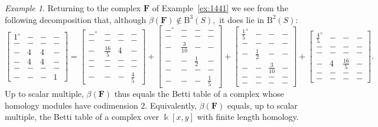 \documentclass[12pt]{amsart}
\theoremstyle{definition}
\theoremstyle{remark}
\newtheorem{example}[lemma]{Example}
\newcommand{\kk}{\Bbbk}
\newcommand{\FF}{\mathbf{F}}
\newcommand{\zp}{\circ}
\newcommand{\BBQ}{\mathrm{B}}
\begin{document}
\begin{example}\label{ex:1441bis}
Returning to the complex $\FF$ of Example~\ref{ex:1441}
we see from the following decomposition that, although $\beta(\FF)\notin \BBQ^3(S),$ it does lie in $\BBQ^2(S)$:
\[
\begin{bmatrix} 1^\zp&-&-&-\\ -&-&-&-\\-&4&4&-\\-&4&4&-\\-&-&-&-\\-&-&-&1 \end{bmatrix}
=
\begin{bmatrix} -^\zp&-&-&-\\ -&-&-&-\\-&\frac{16}{5}&4&-\\-&-&-&-\\-&-&-&-\\-&-&-&\frac{4}{5} \end{bmatrix}
+
\begin{bmatrix} -^\zp&-&-&-\\ -&-&-&-\\-&\frac{3}{10}&-&-\\-&-&\frac{1}{2}&-\\-&-&-&-\\-&-&-&\frac{1}{5} \end{bmatrix}
+
\begin{bmatrix} \frac{1}{5}^\zp&-&-&-\\ -&-&-&-\\-&\frac{1}{2}&-&-\\-&-&\frac{3}{10}&-\\-&-&-&-\\-&-&-&- \end{bmatrix}
+
\begin{bmatrix} \frac{4}{5}^\zp&-&-&-\\ -&-&-&-\\-&-&-&-\\-&4&\frac{16}{5}&-\\-&-&-&-\\-&-&-&- \end{bmatrix}.
\]
Up to scalar multiple, $\beta(\FF)$ thus equals the Betti table of a complex whose homology modules have codimension $2$.  Equivalently, $\beta(\FF)$ 
equals, up to scalar multiple, the Betti table of a complex over $\kk[x,y]$ with finite length homology.
\end{example}
\end{document}
